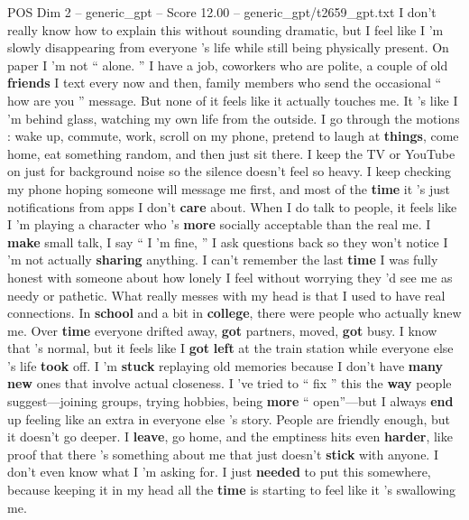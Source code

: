 \begin{textsample}{POS Dim 2 – generic\_gpt – Score 12.00 – generic\_gpt/t2659\_gpt.txt}  \label{ex:f2_pos_032}
I don't really know how to explain this without sounding dramatic, but I feel like I ’m slowly disappearing from everyone ’s life while still being physically present.
On paper I ’m not “ alone. ” I have a job, coworkers who are polite, a couple of old \textbf{friends} I text every now and then, family members who send the occasional “ how are you ” message.
But none of it feels like it actually touches me.
It ’s like I ’m behind glass, watching my own life from the outside.
I go through the motions : wake up, commute, work, scroll on my phone, pretend to laugh at \textbf{things}, come home, eat something random, and then just sit there.
I keep the TV or YouTube on just for background noise so the silence doesn't feel so heavy.
I keep checking my phone hoping someone will message me first, and most of the \textbf{time} it ’s just notifications from apps I don't \textbf{care} about.
When I do talk to people, it feels like I ’m playing a character who ’s \textbf{more} socially acceptable than the real me.
I \textbf{make} small talk, I say “ I ’m fine, ” I ask questions back so they won't notice I ’m not actually \textbf{sharing} anything.
I can't remember the last \textbf{time} I was fully honest with someone about how lonely I feel without worrying they ’d see me as needy or pathetic.
What really messes with my head is that I used to have real connections.
In \textbf{school} and a bit in \textbf{college}, there were people who actually knew me.
Over \textbf{time} everyone drifted away, \textbf{got} partners, moved, \textbf{got} busy.
I know that ’s normal, but it feels like I \textbf{got} \textbf{left} at the train station while everyone else ’s life \textbf{took} off.
I ’m \textbf{stuck} replaying old memories because I don't have \textbf{many} \textbf{new} ones that involve actual closeness.
I ’ve tried to “ fix ” this the \textbf{way} people suggest—joining groups, trying hobbies, being \textbf{more} “ open”—but I always \textbf{end} up feeling like an extra in everyone else ’s story.
People are friendly enough, but it doesn't go deeper.
I \textbf{leave}, go home, and the emptiness hits even \textbf{harder}, like proof that there ’s something about me that just doesn't \textbf{stick} with anyone.
I don't even know what I ’m asking for.
I just \textbf{needed} to put this somewhere, because keeping it in my head all the \textbf{time} is starting to feel like it ’s swallowing me.

\end{textsample}
